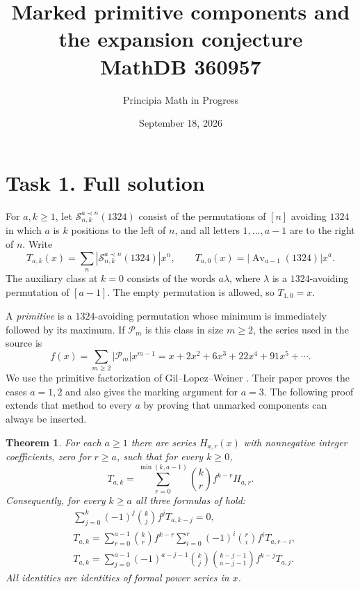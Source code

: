 \documentclass[11pt]{article}
\title{Marked primitive components and the expansion conjecture\\
\large MathDB 360957}
\author{Principia Math in Progress}
\date{September 18, 2026}
\newtheorem{theorem}{Theorem}
\newcommand{\Av}{\operatorname{Av}}
\begin{document}
\maketitle

\section*{Task 1. Full solution}
For $a,k\ge1$, let $\mathcal S^{a\prec n}_{n,k}(1324)$ consist of
the permutations of $[n]$ avoiding $1324$ in which $a$ is $k$ positions
to the left of $n$, and all letters $1,\ldots,a-1$ are to the right
of $n$. Write
\[
 T_{a,k}(x)=\sum_n |\mathcal S^{a\prec n}_{n,k}(1324)|x^n,
 \qquad T_{a,0}(x)=|\Av_{a-1}(1324)|x^a.
\]
The auxiliary class at $k=0$ consists of the words $a\lambda$, where
$\lambda$ is a $1324$-avoiding permutation of $[a-1]$. The empty
permutation is allowed, so $T_{1,0}=x$.

A \emph{primitive} is a $1324$-avoiding permutation whose minimum
is immediately followed by its maximum. If $\mathcal P_m$ is this
class in size $m\ge2$, the series used in the source is
\[
 f(x)=\sum_{m\ge2}|\mathcal P_m|x^{m-1}
     =x+2x^2+6x^3+22x^4+91x^5+\cdots.
\]
We use the primitive factorization of Gil--Lopez--Weiner
\cite[Propositions 2.3--2.4 and Corollary 2.5]{GLW}.
Their paper proves the cases $a=1,2$ and also gives the marking
argument for $a=3$. The following proof extends that method to
every $a$ by proving that unmarked components can always be inserted.

\begin{theorem}\label{main}
For each $a\ge1$ there are series $H_{a,r}(x)$ with nonnegative
integer coefficients, zero for $r\ge a$, such that for every $k\ge0$,
\begin{equation}\label{expansion}
 T_{a,k}=\sum_{r=0}^{\min(k,a-1)}\binom{k}{r}f^{k-r}H_{a,r}.
\end{equation}
Consequently, for every $k\ge a$ all three formulas of
\cite[Conjecture 1]{GLW} hold:
\begin{align}
 &\sum_{j=0}^k(-1)^j\binom{k}{j}f^jT_{a,k-j}=0,\label{first}\\
 &T_{a,k}=\sum_{r=0}^{a-1}\binom{k}{r}f^{k-r}
       \sum_{i=0}^r(-1)^i\binom{r}{i}f^iT_{a,r-i},\label{second}\\
 &T_{a,k}=\sum_{j=0}^{a-1}(-1)^{a-j-1}\binom{k}{j}
       \binom{k-j-1}{a-j-1}f^{k-j}T_{a,j}.\label{third}
\end{align}
All identities are identities of formal power series in $x$.
\end{theorem}
\end{document}
